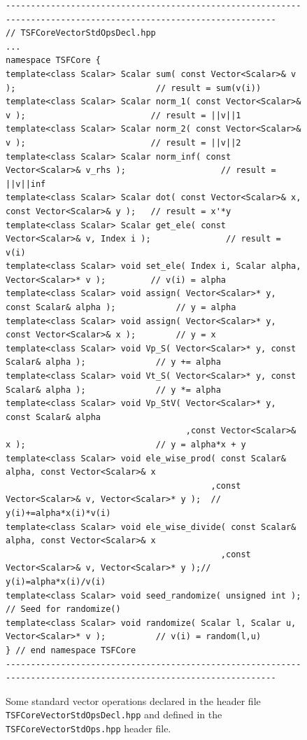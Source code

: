 {\bsinglespace
\begin{figure}[t]
\begin{minipage}{\textwidth}
{\tiny\begin{verbatim}
-----------------------------------------------------------------------------------------------------------------
// TSFCoreVectorStdOpsDecl.hpp
...
namespace TSFCore {
template<class Scalar> Scalar sum( const Vector<Scalar>& v );                            // result = sum(v(i))
template<class Scalar> Scalar norm_1( const Vector<Scalar>& v );                         // result = ||v||1
template<class Scalar> Scalar norm_2( const Vector<Scalar>& v );                         // result = ||v||2
template<class Scalar> Scalar norm_inf( const Vector<Scalar>& v_rhs );                   // result = ||v||inf
template<class Scalar> Scalar dot( const Vector<Scalar>& x, const Vector<Scalar>& y );   // result = x'*y
template<class Scalar> Scalar get_ele( const Vector<Scalar>& v, Index i );               // result = v(i)
template<class Scalar> void set_ele( Index i, Scalar alpha, Vector<Scalar>* v );         // v(i) = alpha
template<class Scalar> void assign( Vector<Scalar>* y, const Scalar& alpha );            // y = alpha
template<class Scalar> void assign( Vector<Scalar>* y, const Vector<Scalar>& x );        // y = x
template<class Scalar> void Vp_S( Vector<Scalar>* y, const Scalar& alpha );              // y += alpha
template<class Scalar> void Vt_S( Vector<Scalar>* y, const Scalar& alpha );              // y *= alpha
template<class Scalar> void Vp_StV( Vector<Scalar>* y, const Scalar& alpha
                                    ,const Vector<Scalar>& x );                          // y = alpha*x + y
template<class Scalar> void ele_wise_prod( const Scalar& alpha, const Vector<Scalar>& x
                                         ,const Vector<Scalar>& v, Vector<Scalar>* y );  // y(i)+=alpha*x(i)*v(i)
template<class Scalar> void ele_wise_divide( const Scalar& alpha, const Vector<Scalar>& x
                                           ,const Vector<Scalar>& v, Vector<Scalar>* y );// y(i)=alpha*x(i)/v(i)
template<class Scalar> void seed_randomize( unsigned int );                              // Seed for randomize()
template<class Scalar> void randomize( Scalar l, Scalar u, Vector<Scalar>* v );          // v(i) = random(l,u)
} // end namespace TSFCore
-----------------------------------------------------------------------------------------------------------------
\end{verbatim}}
\end{minipage}
\caption{
\label{tsfcore:fig:std_vec_ops}
Some standard vector operations declared in the header file \texttt{TSFCore\-Vector\-Std\-Ops\-Decl.hpp}
and defined in the \texttt{TSFCore\-Vector\-Std\-Ops.hpp} header file.
}
\end{figure}
\esinglespace}

